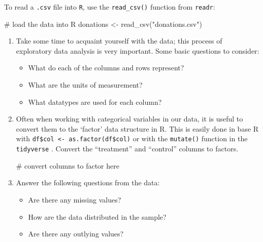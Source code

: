 \documentclass[
  letterpaper,
  DIV=11,
  numbers=noendperiod]{scrartcl}
\newenvironment{Shaded}{\begin{snugshade}}{\end{snugshade}}
\newcommand{\CommentTok}[1]{\textcolor[rgb]{0.37,0.37,0.37}{#1}}
\newcommand{\FunctionTok}[1]{\textcolor[rgb]{0.28,0.35,0.67}{#1}}
\newcommand{\NormalTok}[1]{\textcolor[rgb]{0.00,0.23,0.31}{#1}}
\newcommand{\OtherTok}[1]{\textcolor[rgb]{0.00,0.23,0.31}{#1}}
\newcommand{\StringTok}[1]{\textcolor[rgb]{0.13,0.47,0.30}{#1}}
\providecommand{\tightlist}{%
  \setlength{\itemsep}{0pt}\setlength{\parskip}{0pt}}
\begin{document}
To read a \texttt{.csv} file into \texttt{R}, use the
\texttt{read\_csv()} function from \texttt{readr}:

\begin{Shaded}
\begin{Highlighting}[]
\CommentTok{\# load the data into R}
\NormalTok{donations }\OtherTok{\textless{}{-}} \FunctionTok{read\_csv}\NormalTok{(}\StringTok{"donations.csv"}\NormalTok{)}
\end{Highlighting}
\end{Shaded}

\begin{enumerate}
\def\labelenumi{\arabic{enumi}.}
\setcounter{enumi}{5}
\item
  Take some time to acquaint yourself with the data; this process of
  exploratory data analysis is very important. Some basic questions to
  consider:

  \begin{itemize}
  \tightlist
  \item
    What do each of the columns and rows represent?
  \item
    What are the units of measurement?
  \item
    What datatypes are used for each column?
  \end{itemize}
\item
  Often when working with categorical variables in our data, it is
  useful to convert them to the `factor' data structure in R. This is
  easily done in base R with
  \texttt{df\$col\ \textless{}-\ as.factor(df\$col)} or with the
  \texttt{mutate()} function in the \texttt{tidyverse} . Convert the
  ``treatment'' and ``control'' columns to factors.

\begin{Shaded}
\begin{Highlighting}[]
\CommentTok{\# convert columns to factor here}
\end{Highlighting}
\end{Shaded}
\item
  Answer the following questions from the data:

  \begin{itemize}
  \tightlist
  \item
    Are there any missing values?
  \item
    How are the data distributed in the sample?
  \item
    Are there any outlying values?
  \end{itemize}


\end{enumerate}
\end{document}
